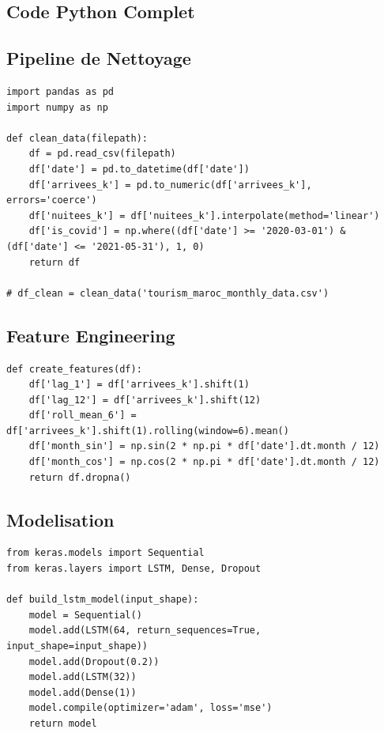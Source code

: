 \documentclass[12pt,a4paper]{report}
\begin{document}
\begin{itemize}[leftmargin=1.5em]
\begin{appendices}
\chapter{Code Python Complet}

\section{Pipeline de Nettoyage}
\begin{lstlisting}
import pandas as pd
import numpy as np

def clean_data(filepath):
    df = pd.read_csv(filepath)
    df['date'] = pd.to_datetime(df['date'])
    df['arrivees_k'] = pd.to_numeric(df['arrivees_k'], errors='coerce')
    df['nuitees_k'] = df['nuitees_k'].interpolate(method='linear')
    df['is_covid'] = np.where((df['date'] >= '2020-03-01') & (df['date'] <= '2021-05-31'), 1, 0)
    return df

# df_clean = clean_data('tourism_maroc_monthly_data.csv')
\end{lstlisting}

\section{Feature Engineering}
\begin{lstlisting}
def create_features(df):
    df['lag_1'] = df['arrivees_k'].shift(1)
    df['lag_12'] = df['arrivees_k'].shift(12)
    df['roll_mean_6'] = df['arrivees_k'].shift(1).rolling(window=6).mean()
    df['month_sin'] = np.sin(2 * np.pi * df['date'].dt.month / 12)
    df['month_cos'] = np.cos(2 * np.pi * df['date'].dt.month / 12)
    return df.dropna()
\end{lstlisting}

\section{Modelisation}
\begin{lstlisting}
from keras.models import Sequential
from keras.layers import LSTM, Dense, Dropout

def build_lstm_model(input_shape):
    model = Sequential()
    model.add(LSTM(64, return_sequences=True, input_shape=input_shape))
    model.add(Dropout(0.2))
    model.add(LSTM(32))
    model.add(Dense(1))
    model.compile(optimizer='adam', loss='mse')
    return model
\end{lstlisting}


\end{appendices}
\end{itemize}
\end{document}
